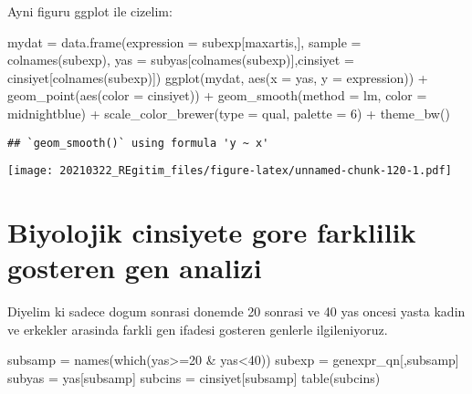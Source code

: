 \documentclass[
]{book}
\newenvironment{Shaded}{\begin{snugshade}}{\end{snugshade}}
\newcommand{\AttributeTok}[1]{\textcolor[rgb]{0.77,0.63,0.00}{#1}}
\newcommand{\DecValTok}[1]{\textcolor[rgb]{0.00,0.00,0.81}{#1}}
\newcommand{\FunctionTok}[1]{\textcolor[rgb]{0.00,0.00,0.00}{#1}}
\newcommand{\NormalTok}[1]{#1}
\newcommand{\OtherTok}[1]{\textcolor[rgb]{0.56,0.35,0.01}{#1}}
\newcommand{\SpecialCharTok}[1]{\textcolor[rgb]{0.00,0.00,0.00}{#1}}
\newcommand{\StringTok}[1]{\textcolor[rgb]{0.31,0.60,0.02}{#1}}
\begin{document}
Ayni figuru ggplot ile cizelim:

\begin{Shaded}
\begin{Highlighting}[]
\NormalTok{mydat }\OtherTok{=} \FunctionTok{data.frame}\NormalTok{(}\AttributeTok{expression =}\NormalTok{ subexp[maxartis,], }\AttributeTok{sample  =} \FunctionTok{colnames}\NormalTok{(subexp), }
                   \AttributeTok{yas =}\NormalTok{ subyas[}\FunctionTok{colnames}\NormalTok{(subexp)],}\AttributeTok{cinsiyet =}\NormalTok{ cinsiyet[}\FunctionTok{colnames}\NormalTok{(subexp)])}
\FunctionTok{ggplot}\NormalTok{(mydat, }\FunctionTok{aes}\NormalTok{(}\AttributeTok{x =}\NormalTok{ yas, }\AttributeTok{y =}\NormalTok{ expression)) }\SpecialCharTok{+}
  \FunctionTok{geom\_point}\NormalTok{(}\FunctionTok{aes}\NormalTok{(}\AttributeTok{color =}\NormalTok{ cinsiyet)) }\SpecialCharTok{+} 
  \FunctionTok{geom\_smooth}\NormalTok{(}\AttributeTok{method =} \StringTok{\textquotesingle{}lm\textquotesingle{}}\NormalTok{, }\AttributeTok{color =} \StringTok{\textquotesingle{}midnightblue\textquotesingle{}}\NormalTok{) }\SpecialCharTok{+}
  \FunctionTok{scale\_color\_brewer}\NormalTok{(}\AttributeTok{type =} \StringTok{\textquotesingle{}qual\textquotesingle{}}\NormalTok{, }\AttributeTok{palette =} \DecValTok{6}\NormalTok{) }\SpecialCharTok{+}
  \FunctionTok{theme\_bw}\NormalTok{()}
\end{Highlighting}
\end{Shaded}

\begin{verbatim}
## `geom_smooth()` using formula 'y ~ x'
\end{verbatim}

\texttt{[image: 20210322\_REgitim\_files/figure-latex/unnamed-chunk-120-1.pdf]}

\hypertarget{biyolojik-cinsiyete-gore-farklilik-gosteren-gen-analizi}{%
\chapter{Biyolojik cinsiyete gore farklilik gosteren gen analizi}\label{biyolojik-cinsiyete-gore-farklilik-gosteren-gen-analizi}}

Diyelim ki sadece dogum sonrasi donemde 20 sonrasi ve 40 yas oncesi yasta kadin ve erkekler arasinda farkli gen ifadesi gosteren genlerle ilgileniyoruz.

\begin{Shaded}
\begin{Highlighting}[]
\NormalTok{subsamp }\OtherTok{=} \FunctionTok{names}\NormalTok{(}\FunctionTok{which}\NormalTok{(yas}\SpecialCharTok{\textgreater{}=}\DecValTok{20} \SpecialCharTok{\&}\NormalTok{ yas}\SpecialCharTok{\textless{}}\DecValTok{40}\NormalTok{))}
\NormalTok{subexp }\OtherTok{=}\NormalTok{ genexpr\_qn[,subsamp]}
\NormalTok{subyas }\OtherTok{=}\NormalTok{ yas[subsamp]}
\NormalTok{subcins }\OtherTok{=}\NormalTok{ cinsiyet[subsamp]}
\FunctionTok{table}\NormalTok{(subcins)}
\end{Highlighting}
\end{Shaded}
\end{document}

